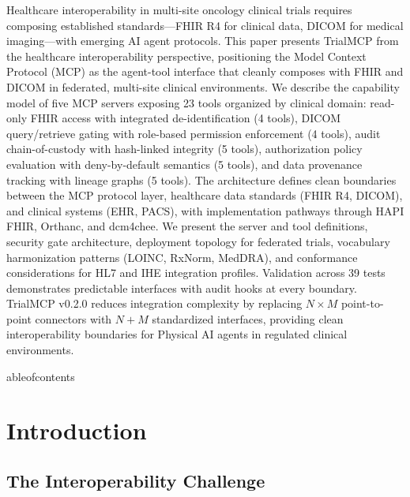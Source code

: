 \documentclass[10pt,letterpaper]{article}
\begin{document}
Healthcare interoperability in multi-site oncology clinical trials requires composing established standards---FHIR R4 for clinical data, DICOM for medical imaging---with emerging AI agent protocols. This paper presents TrialMCP from the healthcare interoperability perspective, positioning the Model Context Protocol (MCP) as the agent-tool interface that cleanly composes with FHIR and DICOM in federated, multi-site clinical environments. We describe the capability model of five MCP servers exposing 23 tools organized by clinical domain: read-only FHIR access with integrated de-identification (4 tools), DICOM query/retrieve gating with role-based permission enforcement (4 tools), audit chain-of-custody with hash-linked integrity (5 tools), authorization policy evaluation with deny-by-default semantics (5 tools), and data provenance tracking with lineage graphs (5 tools). The architecture defines clean boundaries between the MCP protocol layer, healthcare data standards (FHIR R4, DICOM), and clinical systems (EHR, PACS), with implementation pathways through HAPI FHIR, Orthanc, and dcm4chee. We present the server and tool definitions, security gate architecture, deployment topology for federated trials, vocabulary harmonization patterns (LOINC, RxNorm, MedDRA), and conformance considerations for HL7 and IHE integration profiles. Validation across 39 tests demonstrates predictable interfaces with audit hooks at every boundary. TrialMCP v0.2.0 reduces integration complexity by replacing $N \times M$ point-to-point connectors with $N + M$ standardized interfaces, providing clean interoperability boundaries for Physical AI agents in regulated clinical environments.

\vspace{8pt}

	ableofcontents

\section{Introduction}

\subsection{The Interoperability Challenge}
\end{document}
